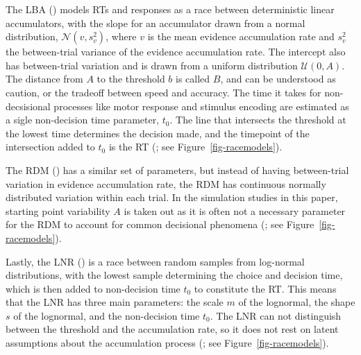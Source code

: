 \documentclass[
  stu,
  longtable,
  nolmodern,
  notxfonts,
  notimes,
  draftfirst,
  colorlinks=true,linkcolor=blue,citecolor=blue,urlcolor=blue]{apa7}
\begin{document}
The LBA () models RTs and
responses as a race between deterministic linear accumulators, with the
slope for an accumulator drawn from a normal distribution,
\(\mathcal{N}(v, s_{v}^2)\), where \(v\) is the mean evidence
accumulation rate and \(s_v^2\) the between-trial variance of the
evidence accumulation rate. The intercept also has between-trial
variation and is drawn from a uniform distribution \(\mathcal{U}(0,A)\).
The distance from \(A\) to the threshold \(b\) is called \(B\), and can
be understood as caution, or the tradeoff between speed and accuracy.
The time it takes for non-decsisional processes like motor response and
stimulus encoding are estimated as a sigle non-decision time parameter,
\(t_0\). The line that intersects the threshold at the lowest time
determines the decision made, and the timepoint of the intersection
added to \(t_0\) is the RT (; see Figure~\ref{fig-racemodels}).

The RDM () has a similar set of
parameters, but instead of having between-trial variation in evidence
accumulation rate, the RDM has continuous normally distributed variation
within each trial. In the simulation studies in this paper, starting
point variability \(A\) is taken out as it is often not a necessary
parameter for the RDM to account for common decisional phenomena
(; see
Figure~\ref{fig-racemodels}).

Lastly, the LNR () is a race
between random samples from log-normal distributions, with the lowest
sample determining the choice and decision time, which is then added to
non-decision time \(t_0\) to constitute the RT. This means that the LNR
has three main parameters: the scale \(m\) of the lognormal, the shape
\(s\) of the lognormal, and the non-decision time \(t_0\). The LNR can
not distinguish between the threshold and the accumulation rate, so it
does not rest on latent assumptions about the accumulation process
(; see
Figure~\ref{fig-racemodels}).
\end{document}
